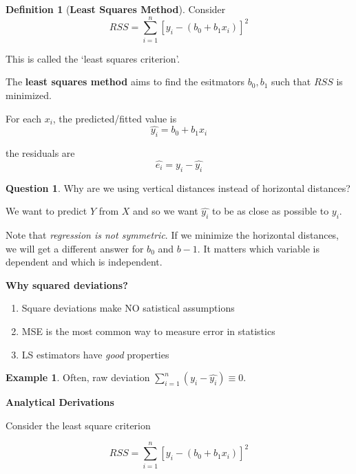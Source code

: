 \documentclass[11pt]{article}
\theoremstyle{definition}
\newtheorem{definition}{Definition}[section]
\newtheorem{example}{Example}[section]
\newtheorem{question}{Question}[section]
\numberwithin{equation}{section}
\begin{document}
\begin{definition}[\textbf{Least Squares Method}]
Consider
\begin{equation}
  RSS = \sum^n_{i=1}[y_i - (b_0 + b_1x_i)]^2
\end{equation}

This is called the `least squares criterion'.

The \textbf{least squares method} aims to find the esitmators $b_0,b_1$ such that $RSS$ is minimized.

For each $x_i$, the predicted/fitted value is
\begin{equation}
  \hat{y_i} = b_0 + b_1x_i
\end{equation}

the residuals are 
\begin{equation}
  \hat{e_i} = y_i - \hat{y_i}
\end{equation}
\end{definition}

\begin{question}
  Why are we using vertical distances instead of horizontal distances?
\end{question}

We want to predict $Y$ from $X$ and so we want $\hat{y_i}$ to be as close as possible to $y_i$. 

Note that \textit{regression is not symmetric}. If we minimize the horizontal distances, we will get a different answer for $b_0$ and $b-1$. It matters which variable is dependent and which is independent.

\textbf{Why squared deviations?}
\begin{enumerate}
  \item Square deviations make NO satistical assumptions
  \item MSE is the most common way to measure error in statistics
  \item LS estimators have \textit{good} properties
\end{enumerate}

\begin{example}
  Often, raw deviation $\sum^n_{i=1}(y_i - \hat{y_i}) \equiv 0$.
\end{example}

\textbf{Analytical Derivations}

Consider the least square criterion

\begin{equation}
 RSS = \sum^n_{i=1}[y_i - (b_0 + b_1x_i)]^2
\end{equation}
\end{document}
